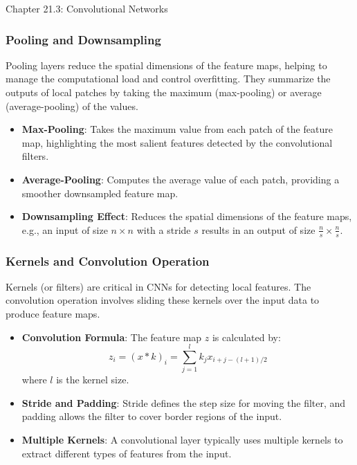 \begin{notes}{Chapter 21.3: Convolutional Networks}
\begin{highlight}
    \end{highlight}
    
    \subsubsection*{Pooling and Downsampling}
    
    Pooling layers reduce the spatial dimensions of the feature maps, helping to manage the computational load and control overfitting. They summarize the outputs of local patches by taking the maximum 
    (max-pooling) or average (average-pooling) of the values.
    
    \begin{highlight}
    
        \begin{itemize}
            \item \textbf{Max-Pooling}: Takes the maximum value from each patch of the feature map, highlighting the most salient features detected by the convolutional filters.
            \item \textbf{Average-Pooling}: Computes the average value of each patch, providing a smoother downsampled feature map.
            \item \textbf{Downsampling Effect}: Reduces the spatial dimensions of the feature maps, e.g., an input of size $n \times n$ with a stride $s$ results in an output of size $\frac{n}{s} \times 
            \frac{n}{s}$.
        \end{itemize}
    
    \end{highlight}
    
    \subsubsection*{Kernels and Convolution Operation}
    
    Kernels (or filters) are critical in CNNs for detecting local features. The convolution operation involves sliding these kernels over the input data to produce feature maps.
    
    \begin{highlight}
    
        \begin{itemize}
            \item \textbf{Convolution Formula}: The feature map $z$ is calculated by:
            \[
            z_i = (x \ast k)_i = \sum_{j=1}^{l} k_j x_{i+j-(l+1)/2}
            \]
            where $l$ is the kernel size.
            \item \textbf{Stride and Padding}: Stride defines the step size for moving the filter, and padding allows the filter to cover border regions of the input.
            \item \textbf{Multiple Kernels}: A convolutional layer typically uses multiple kernels to extract different types of features from the input.
        \end{itemize}
    

\end{highlight}
\end{notes}
